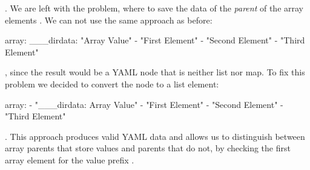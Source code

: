 . We are left with the problem, where to save the data of the \emph{parent}  of the array elements . We can not use the same approach as before:

\begin{yamlcode}
  array:
    ___dirdata: "Array Value"
    - "First Element"
    - "Second Element"
    - "Third Element"
\end{yamlcode}

, since the result would be a YAML node that is neither list nor map. To fix this problem we decided to convert the  node to a list element:

\begin{yamlcode}
  array:
    - "___dirdata: Array Value"
    - "First Element"
    - "Second Element"
    - "Third Element"
\end{yamlcode}

. This approach produces valid YAML data and allows us to distinguish between array parents that store values and parents that do not, by checking the first array element for the value prefix .
